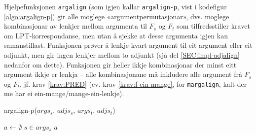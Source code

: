 \documentclass[12pt,a4paper,oneside,draft]{report}
\begin{document}
 Hjelpefunksjonen \texttt{argalign} (som igjen kallar \texttt{argalign-p}, vist i
 kodefigur \ref{algo:argalign-p}) gir alle moglege
 «argumentpermutasjonar», dvs. moglege kombinasjonar av lenkjer mellom
 argumenta til $F_s$ og $F_t$ som tilfredsstiller kravet om
 LPT-korrespondanse, men utan å sjekke at desse argumenta igjen kan
 samanstillast. Funksjonen prøver å lenkje kvart argument til eit
 argument eller eit adjunkt, men gir ingen lenkjer mellom to adjunkt
 (sjå del \ref{SEC:impl-adjalign} nedanfor om dette). Funksjonen gir
 heller ikkje kombinasjonar der minst eitt argument ikkje er lenkja --
 alle kombinasjonane må inkludere alle argument frå $F_s$ og $F_t$,
 jf. krav \ref{krav:PRED} (ev. krav \ref{krav:f-ein-mange}, for
 \texttt{margalign}, kalt der me har ei ein-mange/mange-ein-lenkje). 
  \begin{algorithm}[]
    \caption{argalign-p($args_s$, $adjs_s$, $args_t$, $adjs_t$)}
    \label{algo:argalign-p}
    
    \BlankLine
    
    $a \gets \emptyset$\;
     {
      $s \in args_s$\;
       {
      }
       {
      }
      \Return $a$\;
    }
     {
    }
  \end{algorithm}
\end{document}
